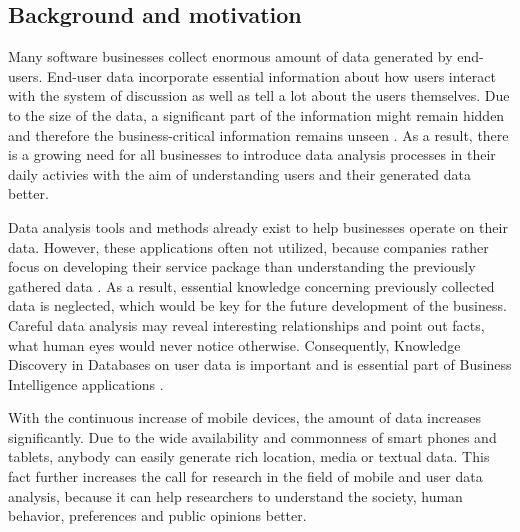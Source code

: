 \subsection{Background and motivation}
	Many software businesses collect enormous amount of data generated by end-users. End-user data incorporate essential information about how users interact with the system of discussion as well as tell a lot about the users themselves. Due to the size of the data, a significant part of the information might remain hidden and therefore the business-critical information remains unseen \cite{inmon2007tapping, wegener2010integrating, introtodatamining}. As a result, there is a growing need for all businesses to introduce data analysis processes in their daily activies with the aim of understanding users and their generated data better.  
	
	Data analysis tools and methods already exist to help businesses operate on their data. However, these applications often not utilized, because companies rather focus on developing their service package than understanding the previously gathered data \cite{inmon2007tapping}. As a result, essential knowledge concerning previously collected data is neglected, which would be key for the future development of the business. Careful data analysis may reveal interesting relationships and point out facts, what human eyes would never notice otherwise. Consequently, Knowledge Discovery in Databases on user data is important and is essential part of Business Intelligence applications \cite{zarsky2002mine}. 

    With the continuous increase of mobile devices, the amount of data increases significantly. Due to the wide availability and commonness of smart phones and tablets, anybody can easily generate rich location, media or textual data. This fact further increases the call for research in the field of mobile and user data analysis, because it can help researchers to understand the society, human behavior, preferences and public opinions better.

